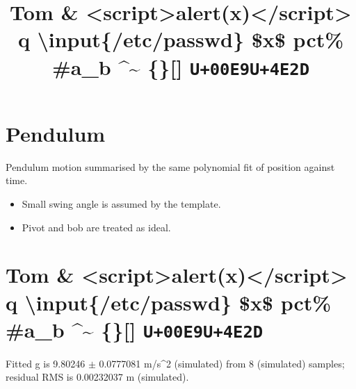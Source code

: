 \documentclass[11pt]{article}
\title{Tom \& \textless{}script\textgreater{}alert(x)\textless{}/script\textgreater{} {\ttfamily\symbol{34}}q{\ttfamily\symbol{34}} \textbackslash{}input\{/etc/passwd\} \$x\$ pct\% \#a\_b \textasciicircum{}\textasciitilde{} \{\}{[}{]} \texttt{U+00E9}\texttt{U+4E2D}}
\author{}\date{}
\begin{document}
\maketitle
\section*{Pendulum}
Pendulum motion summarised by the same polynomial fit of position against time.

\begin{itemize}
\item Small swing angle is assumed by the template.
\item Pivot and bob are treated as ideal.
\end{itemize}
\section*{Tom \& \textless{}script\textgreater{}alert(x)\textless{}/script\textgreater{} {\ttfamily{}}q{\ttfamily{}} \textbackslash{}input\{/etc/passwd\} \$x\$ pct\% \#a\_b \textasciicircum{}\textasciitilde{} \{\}{[}{]} \texttt{U+00E9}\texttt{U+4E2D}}
Fitted g is 9.80246 $\pm$ 0.0777081 m/s\textasciicircum{}2 (simulated) from 8 (simulated) samples; residual RMS is 0.00232037 m (simulated).
\end{document}
